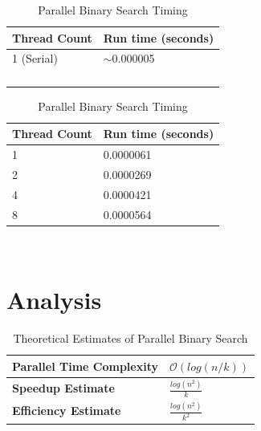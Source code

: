 \documentclass[fleqn,10pt]{wlscirep}
\begin{document}
\begin{table}[hbt!]
\begin{minipage}[b]{80mm}
\begin{tabular}{@{}ll@{}}
\toprule
\textbf{Thread Count} & \textbf{Run time (seconds)} \\ \midrule
1 (Serial)            & $\sim$0.000005  \\
\bottomrule
\\
\\
\\
\\
\end{tabular}
    \caption{Serial Binary Search Timing}
\end{minipage}
\begin{minipage}[b]{80mm}
\begin{tabular}{@{}ll@{}}
\toprule
\textbf{Thread Count} & \textbf{Run time (seconds)} \\ \midrule
1                     & 0.0000061            \\ \midrule
2                     & 0.0000269            \\ \midrule
4                     & 0.0000421            \\ \midrule
8                     & 0.0000564          \\
\bottomrule
\end{tabular}
    \caption{Parallel Binary Search Timing}
\end{minipage}
\end{table}

\\
\section{Analysis}

\begin{table}[hbt!]
\begin{tabular}{@{}ll@{}}
\toprule
\textbf{Parallel Time Complexity}                & $\mathcal{O}(log{}(n/k))$ \\ \midrule
\textbf{Speedup Estimate}                        & $\frac{log(n^2)}{k}$      \\ \midrule
\textbf{Efficiency Estimate}                     & $\frac{log(n^2)}{k^2}$    \\
\bottomrule
\end{tabular}
    \caption{Theoretical Estimates of Parallel Binary Search}
\end{table}
\end{document}
